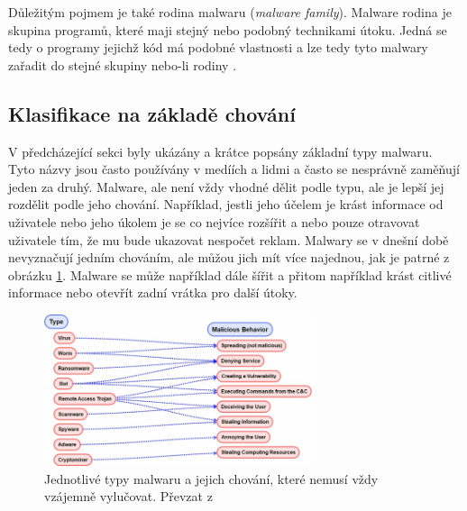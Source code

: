 Důležitým pojmem je také rodina malwaru (\textit{malware family}). Malware rodina je skupina programů, které maji stejný nebo podobný technikami útoku. Jedná se tedy o programy jejichž kód má podobné vlastnosti a lze tedy tyto malwary zařadit do stejné skupiny nebo-li rodiny \cite{malware_fam}. 

\subsection*{Klasifikace na základě chování}
V předcházející sekci byly ukázány a krátce popsány základní typy malwaru. Tyto názvy jsou často používány v medíích a lidmi a často se nesprávně zaměňují jeden za druhý.
Malware, ale není vždy vhodné dělit podle typu, ale je lepší jej rozdělit podle jeho chování. Například, jestli jeho účelem je krást informace od uživatele nebo jeho úkolem je se 
co nejvíce rozšířit a nebo pouze otravovat uživatele tím, že mu bude ukazovat nespočet reklam. Malwary se v dnešní době nevyznačují jedním chováním, ale můžou jich mít více najednou, jak 
je patrné z obrázku \ref{behavior}. Malware se může například dále šířit a přitom například krást citlivé informace nebo otevřít zadní vrátka pro další útoky. 

\begin{figure}[h]
	\centering
        \includegraphics[width=0.7\textwidth]{obrazky/behavior.png}
	\caption{Jednotlivé typy malwaru a jejich chování, které nemusí vždy vzájemně vylučovat. Převzat z \cite{article_malware}}
    \label{behavior}
\end{figure}
\newpage

